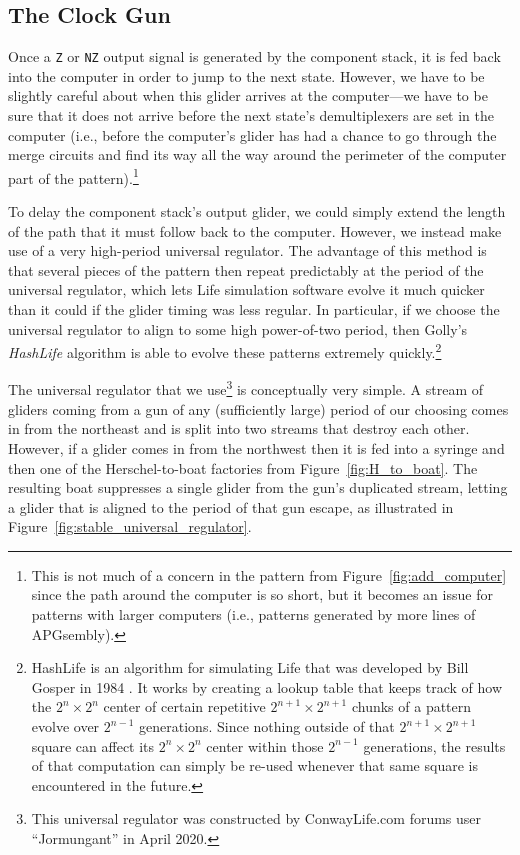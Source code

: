 \subsection{The Clock Gun}

Once a \texttt{Z} or \texttt{NZ} output signal is generated by the component stack, it is fed back into the computer in order to jump to the next state. However, we have to be slightly careful about when this glider arrives at the computer---we have to be sure that it does not arrive before the next state's demultiplexers are set in the computer (i.e., before the computer's glider has had a chance to go through the merge circuits and find its way all the way around the perimeter of the computer part of the pattern).\footnote{This is not much of a concern in the pattern from Figure~\ref{fig:add_computer} since the path around the computer is so short, but it becomes an issue for patterns with larger computers (i.e., patterns generated by more lines of APGsembly).}

To delay the component stack's output glider, we could simply extend the length of the path that it must follow back to the computer. However, we instead make use of a very high-period universal regulator. The advantage of this method is that several pieces of the pattern then repeat predictably at the period of the universal regulator, which lets Life simulation software evolve it much quicker than it could if the glider timing was less regular. In particular, if we choose the universal regulator to align to some high power-of-two period, then Golly's \emph{HashLife} algorithm is able to evolve these patterns extremely quickly.\footnote{HashLife is an algorithm for simulating Life that was developed by Bill Gosper in 1984 \cite{Gos84}. It works by creating a lookup table that keeps track of how the $2^{n} \times 2^{n}$ center of certain repetitive $2^{n+1} \times 2^{n+1}$ chunks of a pattern evolve over $2^{n-1}$ generations. Since nothing outside of that $2^{n+1} \times 2^{n+1}$ square can affect its $2^{n} \times 2^{n}$ center within those $2^{n-1}$ generations, the results of that computation can simply be re-used whenever that same square is encountered in the future.}

The universal regulator that we use\footnote{This universal regulator was constructed by ConwayLife.com forums user ``Jormungant'' in April 2020.} is conceptually very simple. A stream of gliders coming from a gun of any (sufficiently large) period of our choosing comes in from the northeast and is split into two streams that destroy each other. However, if a glider comes in from the northwest then it is fed into a syringe and then one of the Herschel-to-boat factories from Figure~\ref{fig:H_to_boat}. The resulting boat suppresses a single glider from the gun's duplicated stream, letting a glider that is aligned to the period of that gun escape, as illustrated in Figure~\ref{fig:stable_universal_regulator}.


